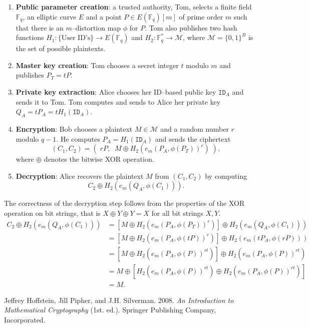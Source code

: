 \documentclass[9pt]{article}
\theoremstyle{definition}
\begin{document}
\begin{enumerate}[label=\textbf{\arabic*.}]
    \item \textbf{Public parameter creation}: a trusted authority, Tom, selects a finite field $\mathbb{F}_q$, an elliptic curve $E$ and a point $P \in E(\mathbb{F}_q)[m]$ of prime order $m$ such that there is an $m$--distortion map $\phi$ for $P$. Tom also publishes two hash functions $H_1 : \{ \text{User ID's} \} \to E(\mathbb{F}_q)$ and $H_2 : \mathbb{F}_q^\ast \to \mathcal{M}$, where $\mathcal{M} = \{0,1\}^B$ is the set of possible plaintexts.
    \item \textbf{Master key creation}: Tom chooses a secret integer $t$ modulo $m$ and publishes $P_T = t P$.
    \item \textbf{Private key extraction}: Alice chooses her ID--based public key $\texttt{ID}_A$ and sends it to Tom. Tom computes and sends to Alice her private key $Q_A = t P_A = t H_1(\texttt{ID}_A)$.
    \item \textbf{Encryption}: Bob chooses a plaintext $M \in \mathcal{M}$ and a random number $r$ modulo $q-1$. He computes $P_A = H_1(\texttt{ID}_A)$ and sends the ciphertext 
    $$\left(C_1, C_2\right) = \left(\; r P, \;\; M \oplus H_2\left(e_m\left(P_A, \phi\left(P_T\right)\right)^r\right) \;\right),$$
    where $\oplus$ denotes the bitwise XOR operation.
    \item \textbf{Decryption}: Alice recovers the plaintext $M$ from $(C_1, C_2)$ by computing 
    $$C_2 \oplus H_2\left(e_m\left(Q_A, \phi\left(C_1\right)\right)\right).$$
\end{enumerate}

The correctness of the decryption step follows from the properties of the XOR operation on bit strings, that is $X \oplus Y \oplus Y = X$ for all bit strings $X,Y$.
\begin{align*}
    C_2 \oplus H_2\left(e_m\left(Q_A, \phi\left(C_1\right)\right)\right) &= \left[M \oplus H_2\left(e_m\left(P_A, \phi\left(P_T\right)\right)^r\right)\right] \oplus H_2\left(e_m\left(Q_A, \phi\left(C_1\right)\right)\right)\\
    &= \left[M \oplus H_2\left(e_m\left(P_A, \phi\left(tP\right)\right)^r\right)\right] \oplus H_2\left(e_m\left(t P_A, \phi\left(rP\right)\right)\right)\\
    &= \left[M \oplus H_2\left(e_m\left(P_A, \phi\left(P\right)\right)^{rt}\right)\right] \oplus H_2\left(e_m\left(P_A, \phi\left(P\right)\right)^{rt}\right)\\
    &= M \oplus \left[H_2\left(e_m\left(P_A, \phi\left(P\right)\right)^{rt}\right) \oplus H_2\left(e_m\left(P_A, \phi\left(P\right)\right)^{rt}\right)\right]\\
    &= M.
\end{align*}

\nocite{*}
\begin{thebibliography}{9}
Jeffrey Hoffstein, Jill Pipher, and J.H. Silverman. 2008. \textit{An Introduction to Mathematical Cryptography} (1st. ed.). Springer Publishing Company, Incorporated.
\end{thebibliography}
\end{document}
